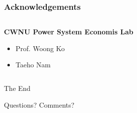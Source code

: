 \documentclass[
	11pt, %
	aspectratio=169, %
]{beamer}
\begin{document}

\begin{frame}
	\frametitle{Acknowledgements}
	
	\begin{columns}[t] %
		\begin{column}{0.45\textwidth} %
			\textbf{CWNU Power System Economis Lab}
			\begin{itemize}
				\item Prof. Woong Ko
				\item Taeho Nam
			\end{itemize}
			
		\end{column}		
		
	\end{columns}
\end{frame}


\begin{frame}[plain] %
	\begin{center}
		{\Huge The End}
		
		\bigskip\bigskip %
		
		{\LARGE Questions? Comments?}
	\end{center}
\end{frame}

\end{document}
